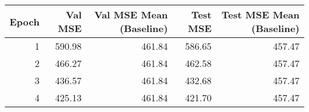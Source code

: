 \begin{tabular}{rrrrr}
\toprule
 Epoch &  Val MSE &  Val MSE Mean (Baseline) &  Test MSE &  Test MSE Mean (Baseline) \\
\midrule
     1 &   590.98 &                   461.84 &    586.65 &                    457.47 \\
     2 &   466.27 &                   461.84 &    462.58 &                    457.47 \\
     3 &   436.57 &                   461.84 &    432.68 &                    457.47 \\
     4 &   425.13 &                   461.84 &    421.70 &                    457.47 \\
\bottomrule
\end{tabular}
